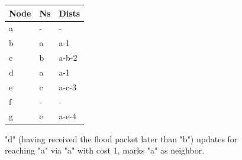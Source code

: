 \documentclass[12pt, oneandhalf, chaparabic, sees, ms]{metu}
\begin{document}
 
  
 
\begin{center}
 \begin{figure}[!htp]
  \begin{center}
   \noindent \begin{minipage}{.7\textwidth}
   \end{minipage}%
   \hfill
    \noindent \begin{minipage}{0.3\textwidth}
  
    \begin{tabular}{ | l | l | l | }
    \hline
    \rowcolor{lightgray}
    Node & Ns & Dists \\ \hline \hline
    a    & -  & -     \\ \hline
    b    & a  & a-1   \\ \hline
    c    & b  & a-b-2 \\ \hline
    \rowcolor{black!50}
    d    & a  & a-1   \\ \hline
    e    & c  & a-c-3 \\ \hline
    f    & -  & -     \\ \hline
    g    & e  & a-e-4 \\
    \hline
   \end{tabular}
   \end{minipage}
   
   \end{center}
    \caption{"d" (having received the flood packet later than "b") updates for reaching "a" via "a" with cost 1, marks "a" as neighbor.}
    \label{fig:lagoon-graph7}
  \end{figure}
\end{center}
 
\end{document}
